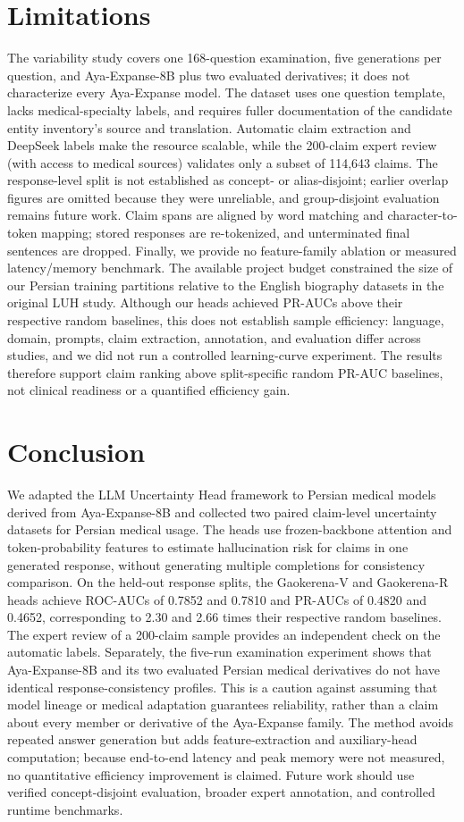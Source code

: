 \documentclass[conference,a4paper]{IEEEtran}
\begin{document}
\section{Limitations}
The variability study covers one 168-question examination, five generations per question, and Aya-Expanse-8B plus two evaluated derivatives; it does not characterize every Aya-Expanse model. The dataset uses one question template, lacks medical-specialty labels, and requires fuller documentation of the candidate entity inventory's source and translation. Automatic claim extraction and DeepSeek labels make the resource scalable, while the 200-claim expert review (with access to medical sources) validates only a subset of 114,643 claims. The response-level split is not established as concept- or alias-disjoint; earlier overlap figures are omitted because they were unreliable, and group-disjoint evaluation remains future work. Claim spans are aligned by word matching and character-to-token mapping; stored responses are re-tokenized, and unterminated final sentences are dropped. Finally, we provide no feature-family ablation or measured latency/memory benchmark. The available project budget constrained the size of our Persian training partitions relative to the English biography datasets in the original LUH study. Although our heads achieved PR-AUCs above their respective random baselines, this does not establish sample efficiency: language, domain, prompts, claim extraction, annotation, and evaluation differ across studies, and we did not run a controlled learning-curve experiment. The results therefore support claim ranking above split-specific random PR-AUC baselines, not clinical readiness or a quantified efficiency gain.

\section{Conclusion}
We adapted the LLM Uncertainty Head framework to Persian medical models derived from Aya-Expanse-8B and collected two paired claim-level uncertainty datasets for Persian medical usage. The heads use frozen-backbone attention and token-probability features to estimate hallucination risk for claims in one generated response, without generating multiple completions for consistency comparison. On the held-out response splits, the Gaokerena-V and Gaokerena-R heads achieve ROC-AUCs of 0.7852 and 0.7810 and PR-AUCs of 0.4820 and 0.4652, corresponding to 2.30 and 2.66 times their respective random baselines. The expert review of a 200-claim sample provides an independent check on the automatic labels. Separately, the five-run examination experiment shows that Aya-Expanse-8B and its two evaluated Persian medical derivatives do not have identical response-consistency profiles. This is a caution against assuming that model lineage or medical adaptation guarantees reliability, rather than a claim about every member or derivative of the Aya-Expanse family. The method avoids repeated answer generation but adds feature-extraction and auxiliary-head computation; because end-to-end latency and peak memory were not measured, no quantitative efficiency improvement is claimed. Future work should use verified concept-disjoint evaluation, broader expert annotation, and controlled runtime benchmarks.
\end{document}
